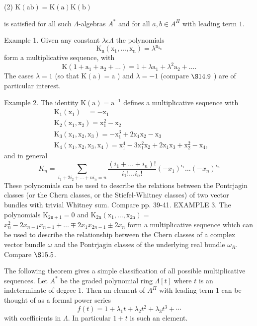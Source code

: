 \documentclass[10pt]{article}
\begin{document}
(2) $\mathrm{K}(\mathrm{ab})=\mathrm{K}(\mathrm{a}) \mathrm{K}(\mathrm{b})$

is satisfied for all such $\Lambda$-algebras $A^{*}$ and for all $a, b \in A^{\Pi}$ with leading term $1 .$

Example 1. Given any constant $\lambda \epsilon \Lambda$ the polynomials
$$
\mathrm{K}_{\mathrm{n}}\left(\mathrm{x}_{1}, \ldots, \mathrm{x}_{\mathrm{n}}\right)=\lambda^{\mathrm{n}_{\mathrm{x}_{\mathrm{n}}}}
$$
form a multiplicative sequence, with
$$
\mathrm{K}\left(1+\mathrm{a}_{1}+\mathrm{a}_{2}+\ldots\right)=1+\lambda \mathrm{a}_{1}+\lambda^{2} \mathrm{a}_{2}+\ldots .
$$
The cases $\lambda=1$ (so that $\mathrm{K}(\mathrm{a})=\mathrm{a}$ ) and $\lambda=-1$ (compare $\S 14.9$ ) are of particular interest.

Example 2. The identity $\mathrm{K}(\mathrm{a})=\mathrm{a}^{-1}$ defines a multiplicative sequence with
$$
\begin{aligned}
& \mathrm{K}_{1}\left(\mathrm{x}_{1}\right) \quad=-\mathrm{x}_{1} \\
& \mathrm{K}_{2}\left(\mathrm{x}_{1}, \mathrm{x}_{2}\right)=\mathrm{x}_{1}^{2}-\mathrm{x}_{2} \\
& \mathrm{K}_{3}\left(\mathrm{x}_{1}, \mathrm{x}_{2}, \mathrm{x}_{3}\right)=-\mathrm{x}_{1}^{3}+2 \mathrm{x}_{1} \mathrm{x}_{2}-\mathrm{x}_{3} \\
& \mathrm{K}_{4}\left(\mathrm{x}_{1}, \mathrm{x}_{2}, \mathrm{x}_{3}, \mathrm{x}_{4}\right)=\mathrm{x}_{1}^{4}-3 \mathrm{x}_{1}^{2} \mathrm{x}_{2}+2 \mathrm{x}_{1} \mathrm{x}_{3}+\mathrm{x}_{2}^{2}-\mathrm{x}_{4} \text {, }
\end{aligned}
$$
and in general
$$
K_{n}=\sum_{i_{1}+2 i_{2}+\ldots+n i_{n}=n} \frac{\left(i_{1}+\ldots+i_{n}\right) !}{i_{1} ! \ldots i_{n} !}\left(-x_{1}\right)^{i_{1}} \ldots\left(-x_{n}\right)^{i_{n}}
$$
These polynomials can be used to describe the relations between the Pontrjagin classes (or the Chern classes, or the Stiefel-Whitney classes) of two vector bundles with trivial Whitney sum. Compare pp. 39-41. EXAMPLE 3. The polynomials $\mathrm{K}_{2 \mathrm{n}+1}=0$ and $\mathrm{K}_{2 \mathrm{n}}\left(\mathrm{x}_{1}, \ldots, \mathrm{x}_{2 \mathrm{n}}\right)=$ $x_{n}^{2}-2 x_{n-1} x_{n+1}+\ldots \mp 2 x_{1} x_{2 n-1} \pm 2 x_{n}$ form a multiplicative sequence which can be used to describe the relationship between the Chern classes of a complex vector bundle $\omega$ and the Pontrjagin classes of the underlying real bundle $\omega_{R}$. Compare $\S 15.5$.

The following theorem gives a simple classification of all possible multiplicative sequences. Let $A^{*}$ be the graded polynomial ring $\Lambda[t]$ where $t$ is an indeterminate of degree 1. Then an element of $A^{\Pi}$ with leading term 1 can be thought of as a formal power series
$$
f(t)=1+\lambda_{1} t+\lambda_{2} t^{2}+\lambda_{3} t^{3}+\cdots
$$
with coefficients in $\Lambda$. In particular $1+t$ is such an element.
\end{document}
